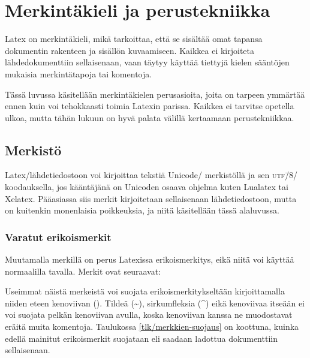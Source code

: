 
\chapter{Merkintäkieli ja perustekniikka}

Latex on merkintäkieli, mikä tarkoittaa, että se sisältää omat tapansa
dokumentin rakenteen ja sisällön kuvaamiseen. Kaikkea ei kirjoiteta
lähdedokumenttiin sellaisenaan, vaan täytyy käyttää tiettyjä kielen
sääntöjen mukaisia merkintätapoja tai komentoja.

Tässä luvussa käsitellään merkintäkielen perusasioita, joita on tarpeen
ymmärtää ennen kuin voi tehokkaasti toimia Latexin parissa. Kaikkea ei
tarvitse opetella ulkoa, mutta tähän lukuun on hyvä palata välillä
kertaamaan perustekniikkaa.

\section{Merkistö}

Latex\-/lähdetiedostoon voi kirjoittaa tekstiä Unicode\-/ merkistöllä ja
sen \textsc{utf}\=/8\-/ koodauksella, jos kääntäjänä on Unicoden osaava
ohjelma kuten Lualatex tai Xelatex. Pääasiassa siis merkit kirjoitetaan
sellaisenaan lähdetiedostoon, mutta on kuitenkin monenlaisia
poikkeuksia, ja niitä käsitellään tässä alaluvussa.

\subsection{Varatut erikoismerkit}

Muutamalla merkillä on perus Latexissa erikoismerkitys, eikä niitä voi
käyttää normaalilla tavalla. Merkit ovat seuraavat:

\begin{koodilohkosis}
\end{koodilohkosis}

\noindent
Useimmat näistä merkeistä voi suojata erikoismerkitykseltään
kirjoittamalla niiden eteen kenoviivan (\koodi{\keno}). Tildeä
(\textasciitilde), sirkumfleksia (\textasciicircum) eikä kenoviivaa
itseään ei voi suojata pelkän kenoviivan avulla, koska kenoviivan kanssa
ne muodostavat eräitä muita komentoja. Taulukossa
\ref{tlk/merkkien-suojaus} on koottuna, kuinka edellä mainitut
erikoismerkit suojataan eli saadaan ladottua dokumenttiin sellaisenaan.

